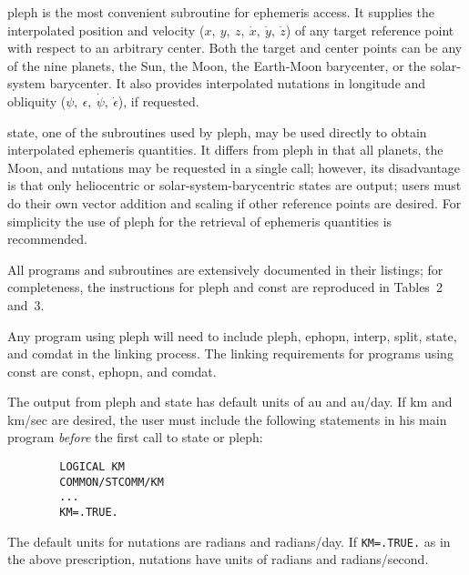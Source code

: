 {\csc pleph} is the most convenient subroutine for ephemeris access.
It supplies the interpolated position and velocity ($x,\>y,\>z,
\>\dot x,\>\dot y,\>\dot z$)
of any target reference point with respect to an arbitrary center.
Both the target and center points can be any of the nine
planets, the Sun, the Moon, the Earth-Moon barycenter, or the
solar-system barycenter. It also provides interpolated nutations
in longitude and obliquity ($\psi,\>\epsilon,\>\dot\psi,
\>\dot\epsilon$), if requested.
 
{\csc state}, one of the subroutines used by {\csc pleph},
may be used directly to obtain interpolated ephemeris quantities.
It differs from {\csc pleph} in that all planets, the Moon, and
nutations may be requested in a single call; however, its disadvantage
is that only heliocentric or solar-system-barycentric states are output;
users must do their own vector addition and scaling if other
reference points are desired. For simplicity the use of {\csc pleph}
for the retrieval of ephemeris quantities is recommended.
 
All programs and subroutines are extensively documented in their
listings; for completeness, the instructions for {\csc pleph}
and {\csc const} are reproduced in Tables~2 and~3.
 
Any program using {\csc pleph} will need to include
{\csc pleph, ephopn, interp, split, state}, and {\csc comdat}
in the linking process. The linking requirements for
programs using {\csc const} are {\csc const, ephopn}, and
{\csc comdat}.
 
The output from {\csc pleph \rm and \csc state}
has default units of {\csc au} and {\csc au}/day. If km and km/sec
are desired, the user must include the following statements
in his main program {\it before\/} the first call to {\csc state}
or {\csc pleph}:
%
\begin{verbatim}
        LOGICAL KM
        COMMON/STCOMM/KM
        ...
        KM=.TRUE.
\end{verbatim}
The default units for nutations are radians and radians/day. If
{\tt KM=.TRUE.} as in the above prescription, nutations have units
of radians and radians/second.


